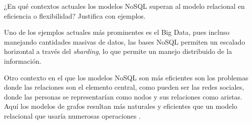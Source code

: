¿En qué contextos actuales los modelos NoSQL superan al modelo relacional en eficiencia o flexibilidad? Justifica con ejemplos.

Uno de los ejemplos actuales más prominentes es el Big Data, pues incluso manejando cantidades masivas de datos, las bases NoSQL permiten un escalado horizontal a través del \textit{sharding}, lo que permite un manejo distribuido de la información.\cite{ibm_nosql_databases}

Otro contexto en el que los modelos NoSQL son más eficientes son los problemas donde las relaciones son el elemento central, como pueden ser las redes sociales, donde las personas se representarían como nodos y sus relaciones como aristas. Aquí los modelos de grafos resultan más naturales y eficientes que un modelo relacional que usaría numerosas operaciones .
